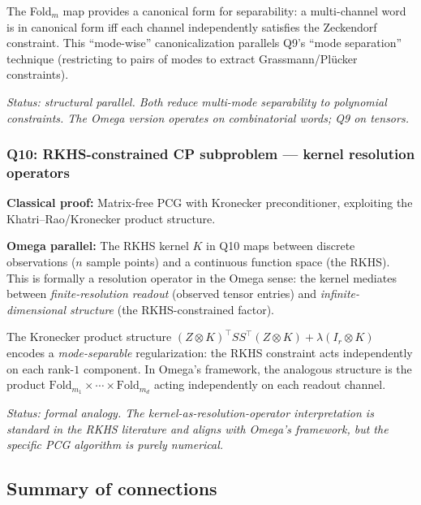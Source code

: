 The Fold$_m$ map provides a canonical form for separability: a
multi-channel word is in canonical form iff each channel independently
satisfies the Zeckendorf constraint.  This ``mode-wise'' canonicalization
parallels Q9's ``mode separation'' technique (restricting to pairs
of modes to extract Grassmann/Pl\"{u}cker constraints).

\emph{Status: structural parallel.  Both reduce multi-mode separability
to polynomial constraints.  The Omega version operates on combinatorial
words; Q9 on tensors.}


\subsubsection*{Q10: RKHS-constrained CP subproblem ---
  kernel resolution operators}

\noindent\textbf{Classical proof:} Matrix-free PCG with Kronecker
preconditioner, exploiting the Khatri--Rao/Kronecker product structure.

\noindent\textbf{Omega parallel:}
The RKHS kernel $K$ in Q10 maps between discrete observations
($n$ sample points) and a continuous function space (the RKHS).
This is formally a resolution operator in the Omega sense:
the kernel mediates between \emph{finite-resolution readout}
(observed tensor entries) and \emph{infinite-dimensional structure}
(the RKHS-constrained factor).

The Kronecker product structure
$(Z\otimes K)^\top SS^\top(Z\otimes K)+\lambda(I_r\otimes K)$
encodes a \emph{mode-separable} regularization: the RKHS constraint
acts independently on each rank-$1$ component.
In Omega's framework, the analogous structure is the product
$\mathrm{Fold}_{m_1}\times\cdots\times\mathrm{Fold}_{m_d}$
acting independently on each readout channel.

\emph{Status: formal analogy.  The kernel-as-resolution-operator
interpretation is standard in the RKHS literature and aligns with
Omega's framework, but the specific PCG algorithm is purely numerical.}


\subsection{Summary of connections}

